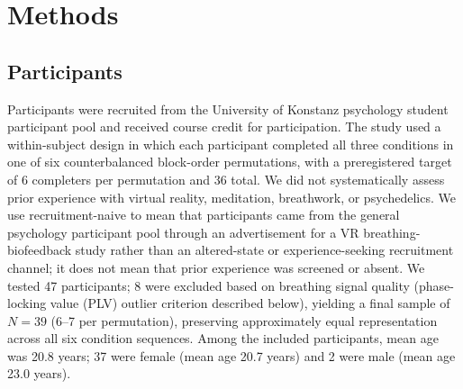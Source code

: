 \documentclass[pdflatex,sn-basic,lineno]{sn-jnl}
\begin{document}
\section{Methods}\label{sec:methods}

\subsection{Participants}\label{subsec:participants}
Participants were recruited from the University of Konstanz psychology student participant pool and received course credit for participation. The study used a within-subject design in which each participant completed all three conditions in one of six counterbalanced block-order permutations, with a preregistered target of 6 completers per permutation and 36 total. We did not systematically assess prior experience with virtual reality, meditation, breathwork, or psychedelics. We use recruitment-naive to mean that participants came from the general psychology participant pool through an advertisement for a VR breathing-biofeedback study rather than an altered-state or experience-seeking recruitment channel; it does not mean that prior experience was screened or absent. We tested 47 participants; 8 were excluded based on breathing signal quality (phase-locking value (PLV) outlier criterion described below), yielding a final sample of $N = 39$ (6--7 per permutation), preserving approximately equal representation across all six condition sequences. Among the included participants, mean age was 20.8 years; 37 were female (mean age 20.7 years) and 2 were male (mean age 23.0 years).
\end{document}
